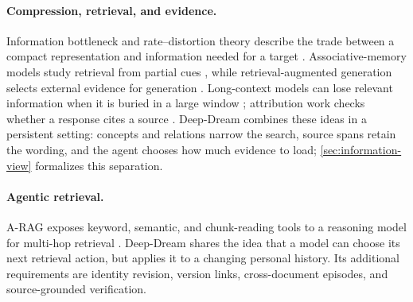 \paragraph{Compression, retrieval, and evidence.}
Information bottleneck and rate--distortion theory describe the trade between a compact representation and information needed for a target \citep{tishby2000information,shannon1959coding}. Associative-memory models study retrieval from partial cues \citep{ramsauer2021hopfield}, while retrieval-augmented generation selects external evidence for generation \citep{lewis2020rag}. Long-context models can lose relevant information when it is buried in a large window \citep{liu2024lost}; attribution work checks whether a response cites a source \citep{gao2023alce}. Deep-Dream combines these ideas in a persistent setting: concepts and relations narrow the search, source spans retain the wording, and the agent chooses how much evidence to load; \cref{sec:information-view} formalizes this separation.

\paragraph{Agentic retrieval.}
A-RAG exposes keyword, semantic, and chunk-reading tools to a reasoning model for multi-hop retrieval \citep{du2026arag}. Deep-Dream shares the idea that a model can choose its next retrieval action, but applies it to a changing personal history. Its additional requirements are identity revision, version links, cross-document episodes, and source-grounded verification.
